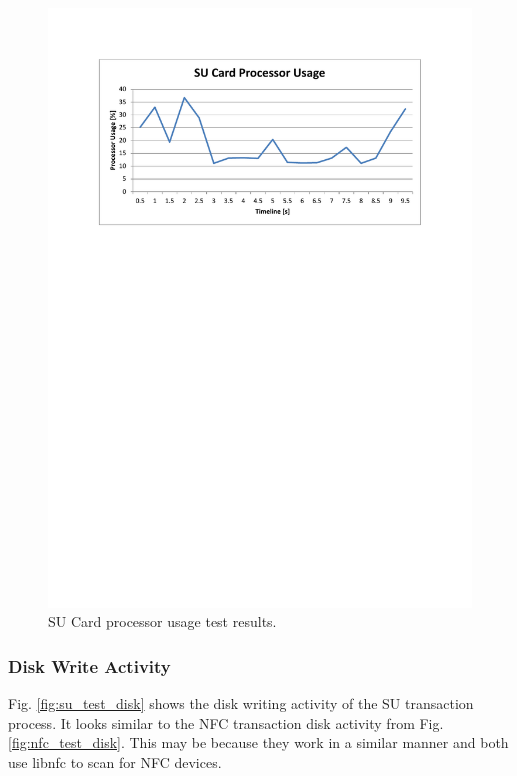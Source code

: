 \begin{figure}
 \centering 
 \includegraphics[clip=true, trim = 0 530 0 70,
 scale=0.7]{su_test_cpu}
 \caption{SU Card processor usage test results.}
 \label{fig:su_test_cpu}
\end{figure}

\subsubsection{Disk Write Activity}

Fig. \ref{fig:su_test_disk} shows the disk writing activity of the SU transaction
process.  It looks similar to the NFC transaction disk activity from Fig.
\ref{fig:nfc_test_disk}. This may be because they work in a similar manner and both use
libnfc to scan for NFC devices.


